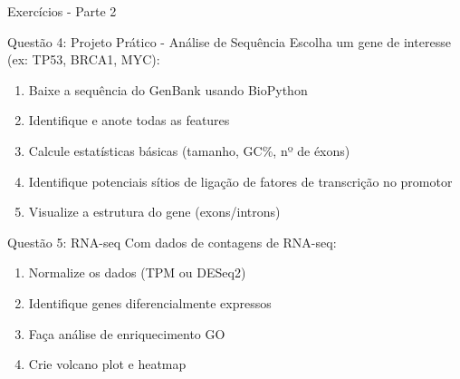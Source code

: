 \begin{frame}[allowframebreaks]{Exercícios - Parte 2}
\begin{alertblock}{Questão 4: Projeto Prático - Análise de Sequência}
Escolha um gene de interesse (ex: TP53, BRCA1, MYC):
\begin{enumerate}
    \item Baixe a sequência do GenBank usando BioPython
    \item Identifique e anote todas as features
    \item Calcule estatísticas básicas (tamanho, GC\%, nº de éxons)
    \item Identifique potenciais sítios de ligação de fatores de transcrição no promotor
    \item Visualize a estrutura do gene (exons/introns)
\end{enumerate}
\end{alertblock}

\vspace{0.3cm}

\begin{block}{Questão 5: RNA-seq}
Com dados de contagens de RNA-seq:
\begin{enumerate}
    \item Normalize os dados (TPM ou DESeq2)
    \item Identifique genes diferencialmente expressos
    \item Faça análise de enriquecimento GO
    \item Crie volcano plot e heatmap
\end{enumerate}
\end{block}
\end{frame}

